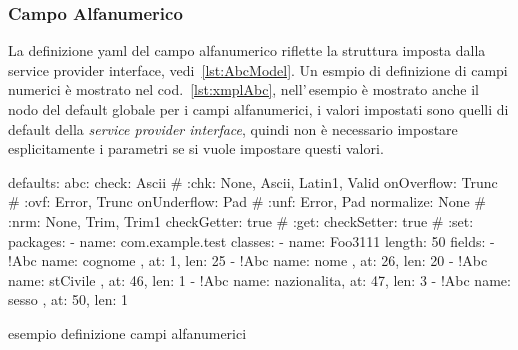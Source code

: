 \documentclass[a4paper,10pt]{report}
\newif\ifesource
\newenvironment{elisting}[1][!htb]
  {\captionsetup{aboveskip=0pt}\begin{listing}[#1]}
  {\end{listing}%
}
\begin{document}
\subsubsection{Campo Alfanumerico} \label{sub:yaml.abc}
La definizione yaml del campo alfanumerico riflette la struttura imposta dalla
service provider interface, vedi~\ref{lst:AbcModel}.
Un esmpio di definizione di campi numerici è mostrato nel 
cod.~\ref{lst:xmplAbc}, nell'\,esempio è mostrato anche il nodo del default
globale per i campi alfanumerici, i valori impostati sono quelli di default
della \textsl{service provider interface}, quindi non è necessario impostare
esplicitamente i parametri se si vuole impostare questi valori.

\ifesource
\begin{figure*}[!htb]
\begin{lstlisting}[language=yaml, caption={esempio definizione campi alfanumerici}, 
label=lst:xmplAbc]
defaults:
  abc:
    check: Ascii        # :chk: None, Ascii, Latin1, Valid
    onOverflow: Trunc   # :ovf: Error, Trunc
    onUnderflow: Pad    # :unf: Error, Pad
    normalize: None     # :nrm: None, Trim, Trim1
    checkGetter: true   # :get:
    checkSetter: true   # :set:
packages:
  - name: com.example.test
    classes:
      - name: Foo3111
        length: 50
        fields:
          - !Abc { name: cognome    , at:   1, len:    25 }
          - !Abc { name: nome       , at:  26, len:    20 }
          - !Abc { name: stCivile   , at:  46, len:     1 }
          - !Abc { name: nazionalita, at:  47, len:     3 }
          - !Abc { name: sesso      , at:  50, len:     1 }
\end{lstlisting}
\end{figure*}
\else
\begin{elisting}
\begin{yamlcode}
defaults:
  abc:
    check: Ascii        # :chk: None, Ascii, Latin1, Valid
    onOverflow: Trunc   # :ovf: Error, Trunc
    onUnderflow: Pad    # :unf: Error, Pad
    normalize: None     # :nrm: None, Trim, Trim1
    checkGetter: true   # :get:
    checkSetter: true   # :set:
packages:
  - name: com.example.test
    classes:
      - name: Foo3111
        length: 50
        fields:
          - !Abc { name: cognome    , at:   1, len:    25 }
          - !Abc { name: nome       , at:  26, len:    20 }
          - !Abc { name: stCivile   , at:  46, len:     1 }
          - !Abc { name: nazionalita, at:  47, len:     3 }
          - !Abc { name: sesso      , at:  50, len:     1 }
\end{yamlcode}
\caption{esempio definizione campi alfanumerici}
\label{lst:xmplAbc}
\end{elisting}
\fi
\end{document}
